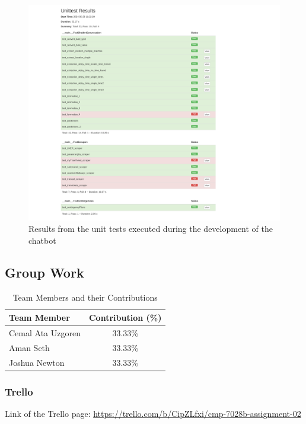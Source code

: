 \begin{figure}[!htbp]
    \centering
    \includegraphics[width=1.2\textwidth]{../Tests/TestResults_TestChatbotConversation_TestScrapers_TestContingencies_2024-05-28_11-22-39.pdf}
    \caption{Results from the unit tests executed during the development of the chatbot}
    \label{Fig: unit test results}
\end{figure}

\clearpage
\subsection{Group Work}
\begin{table}[H]
    \centering
    \begin{tabular}{|l|c|}
        \hline
        \textbf{Team Member} & \textbf{Contribution (\%)} \\
        \hline
        Cemal Ata Uzgoren & 33.33\% \\
        \hline
        Aman Seth & 33.33\% \\
        \hline
        Joshua Newton & 33.33\% \\
        \hline
    \end{tabular}
    \caption{Team Members and their Contributions}
    \label{tab:team_contributions}
\end{table}

\subsubsection{Trello}
Link of the Trello page: \url{https://trello.com/b/CipZLfxi/cmp-7028b-assignment-02}


